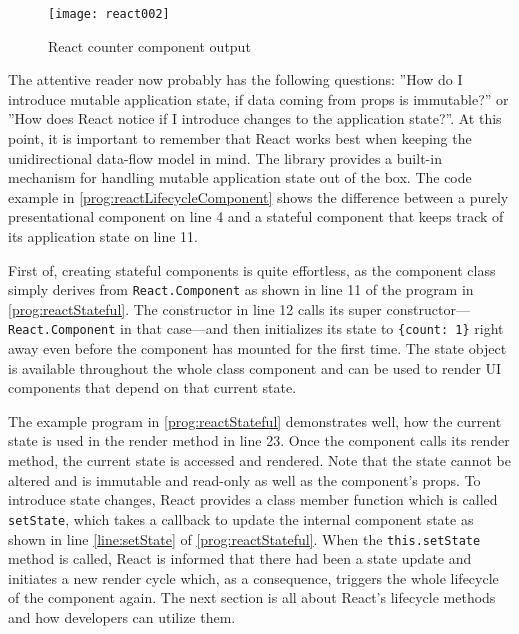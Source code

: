 \begin{figure}
  \centering
  \texttt{[image: react002]}
  \caption{React counter component output}
  \label{fig:reactCounterComponent}
\end{figure}

The attentive reader now probably has the following questions: ''How do I introduce mutable application state, if data coming from props is immutable?'' or ''How does React notice if I introduce changes to the application state?''. At this point, it is important to remember that React works best when keeping the unidirectional data-flow model in mind. The library provides a built-in mechanism for handling mutable application state out of the box. The code example in \ref{prog:reactLifecycleComponent} shows the difference between a purely presentational component on line 4 and a stateful component that keeps track of its application state on line 11.

First of, creating stateful components is quite effortless, as the component class simply derives from \texttt{React.Component} as shown in line 11 of the program in \ref{prog:reactStateful}. The constructor in line 12 calls its super constructor---\texttt{React.Component} in that case---and then initializes its state to \texttt{\{count: 1\}} right away even before the component has mounted for the first time. The state object is available throughout the whole class component and can be used to render UI components that depend on that current state.

The example program in \ref{prog:reactStateful} demonstrates well, how the current state is used in the render method in line 23. Once the component calls its render method, the current state is accessed and rendered. Note that the state cannot be altered and is immutable and read-only as well as the component's props. To introduce state changes, React provides a class member function which is called \texttt{setState}, which takes a callback to update the internal component state as shown in line \ref{line:setState} of \ref{prog:reactStateful}. When the \texttt{this.setState} method is called, React is informed that there had been a state update and initiates a new render cycle which, as a consequence, triggers the whole lifecycle of the component again. The next section is all about React's lifecycle methods and how developers can utilize them.



